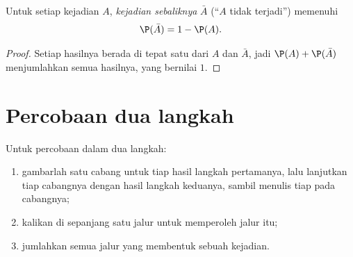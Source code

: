 \begin{proposition}[Komplemen]\label{prop:g9:statproba:complement}
Untuk setiap kejadian $A$, \emph{kejadian sebaliknya} $\bar A$ (``$A$
tidak terjadi'') memenuhi
\[
\P(\bar A) = 1 - \P(A).
\]
\end{proposition}

\begin{proof}
Setiap hasilnya berada di tepat satu dari $A$ dan $\bar A$, jadi
$\P(A) + \P(\bar A)$ menjumlahkan  semua hasilnya, yang bernilai
$1$.
\end{proof}

\section{Percobaan dua langkah}

\begin{method}\label{met:g9:statproba:tree}
Untuk percobaan dalam dua langkah:
\begin{enumerate}
  \item gambarlah satu cabang untuk tiap hasil langkah pertamanya,
        lalu lanjutkan tiap cabangnya dengan hasil langkah keduanya,
        sambil menulis tiap  pada cabangnya;
  \item kalikan  di sepanjang satu jalur untuk memperoleh
         jalur itu;
  \item jumlahkan  semua jalur yang membentuk sebuah kejadian.
\end{enumerate}
\end{method}

